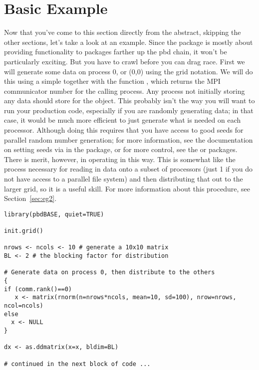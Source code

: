 \section[]{Basic Example}\label{sec:eg1}

Now that you've come to this section directly from the abstract, skipping the other sections, let's take a look at an example.  Since the  package is mostly about providing functionality to packages farther up the pbd chain, it won't be particularly exciting.  But you have to crawl before you can drag race.
\np
First we will generate some data on process 0, or (0,0) using the grid notation.  We will do this using a simple  together with the  function , which returns the MPI communicator number for the calling process.  Any process not initially storing any data should store  for the object.  This probably isn't the way you will want to run your production code, especially if you are randomly generating data; in that case, it would be much more efficient to just generate what is needed on each processor.  Although doing this requires that you have access to good seeds for parallel random number generation; for more information, see the documentation on setting seeds via  in the  package, or for more control, see the  or  packages.  
\np
There is merit, however, in operating in this way.  This is somewhat like the process necessary for reading in data onto a subset of processors (just 1 if you do not have access to a parallel file system) and then distributing that out to the larger grid, so it is a useful skill.  For more information about this procedure, see Section~\ref{sec:eg2}.

\begin{lstlisting}[language=rr,title=Generating Test Data]
library(pbdBASE, quiet=TRUE)

init.grid()

nrows <- ncols <- 10 # generate a 10x10 matrix
BL <- 2 # the blocking factor for distribution

# Generate data on process 0, then distribute to the others
{
if (comm.rank()==0)
   x <- matrix(rnorm(n=nrows*ncols, mean=10, sd=100), nrow=nrows, ncol=ncols)
else
  x <- NULL
}
  
dx <- as.ddmatrix(x=x, bldim=BL)

# continued in the next block of code ...
\end{lstlisting}

